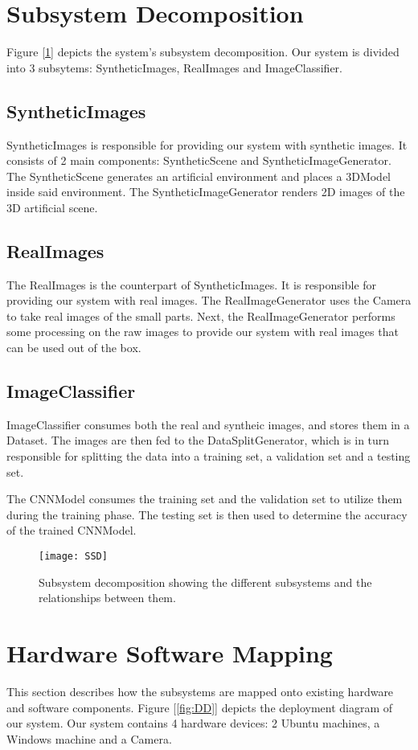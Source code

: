 \section{Subsystem Decomposition}

Figure [\ref{fig:SSD}] depicts the system's subsystem decomposition. Our system is divided into 3 subsytems: SyntheticImages, RealImages and ImageClassifier.

\subsection{SyntheticImages}
SyntheticImages is responsible for providing our system with synthetic images. It consists of 2 main components: SyntheticScene and SyntheticImageGenerator. The SyntheticScene generates an artificial environment and places a 3DModel inside said environment. The SyntheticImageGenerator renders 2D images of the 3D artificial scene.

\subsection{RealImages}
The RealImages is the counterpart of SyntheticImages. It is responsible for providing our system with real images. The RealImageGenerator uses the Camera to take real images of the small parts. Next, the RealImageGenerator performs some processing on the raw images to provide our system with real images that can be used out of the box.

\subsection{ImageClassifier}
ImageClassifier consumes both the real and syntheic images, and stores them in a Dataset. The images are then fed to the DataSplitGenerator, which is in turn responsible for splitting the data into a training set, a validation set and a testing set.

The CNNModel consumes the training set and the validation set to utilize them during the training phase. The testing set is then used to determine the accuracy of the trained CNNModel.

\begin{figure}[H]
\centering
  \texttt{[image: SSD]}
\caption{Subsystem decomposition showing the different subsystems and the relationships between them.}
\label{fig:SSD}
\end{figure}

\section{Hardware Software Mapping}
This section describes how the subsystems are mapped onto existing hardware and software components. Figure [\ref{fig:DD}] depicts the deployment diagram of our system. Our system contains 4 hardware devices: 2 Ubuntu machines, a Windows machine and a Camera.

